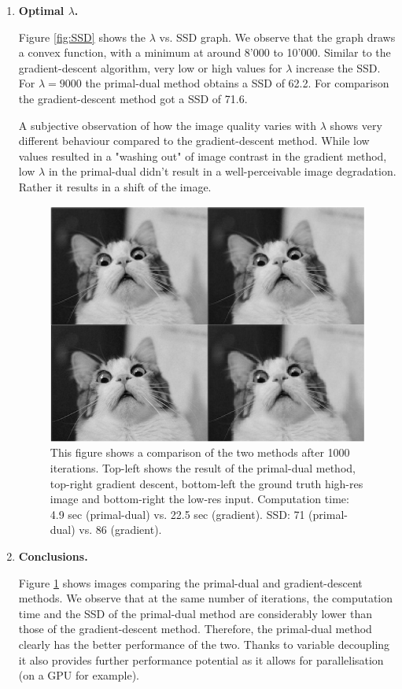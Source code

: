 \documentclass{paper}
\begin{document}
\begin{enumerate}
\item \textbf{ Optimal $\lambda$.} 

Figure \ref{fig:SSD} shows the $\lambda$ vs. SSD graph. We observe that the graph draws a convex function, with a minimum at around 8'000 to 10'000. Similar to the gradient-descent algorithm, very low or high values  for $\lambda$ increase the SSD. For $\lambda=9000$ the primal-dual method obtains a SSD of 62.2. For comparison the gradient-descent method got a SSD of 71.6.


A subjective observation of how the image quality varies with $\lambda$ shows very different behaviour compared to the gradient-descent method. While low values resulted in a "washing out" of image contrast in the gradient method, low $\lambda$ in the primal-dual didn't result in a well-perceivable image degradation. Rather it results in a shift of the image.

\begin{figure}[h]
\begin{center}
         \includegraphics[width=0.9\linewidth]{cat}       
\end{center}
\caption{This figure shows a comparison of the two methods after 1000 iterations. Top-left shows the result of the primal-dual method, top-right gradient descent, bottom-left the ground truth high-res image and bottom-right the low-res input. Computation time: 4.9 sec (primal-dual)  vs. 22.5 sec (gradient). SSD: 71 (primal-dual) vs. 86 (gradient).}
\label{fig:cat}
\end{figure}

\item \textbf{ Conclusions.} 

Figure \ref{fig:cat} shows images comparing the primal-dual and gradient-descent methods. We observe that at the same number of iterations, the computation time and the SSD of the primal-dual method are considerably lower than those of the gradient-descent method. Therefore, the primal-dual method clearly has the better performance of the two. Thanks to variable decoupling it also provides further performance potential as it allows for parallelisation (on a GPU for example). 


\end{enumerate}
\end{document}
